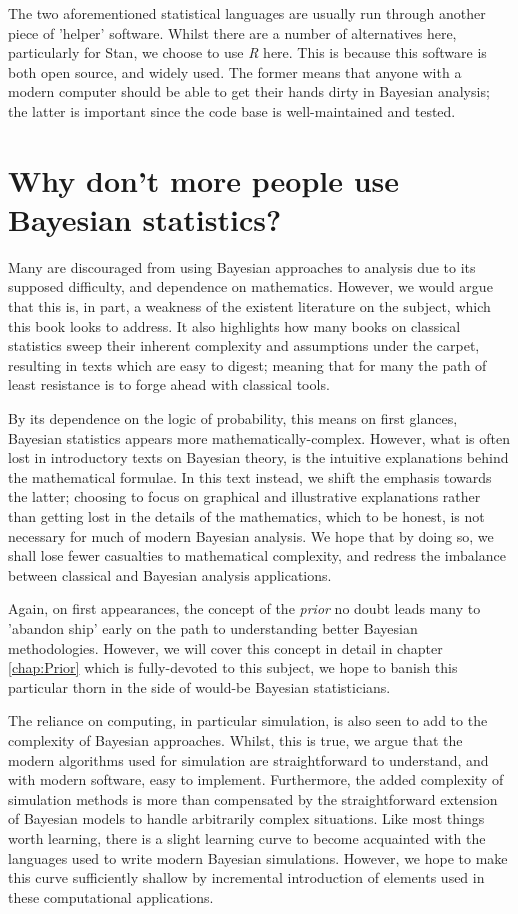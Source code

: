 \documentclass[11pt,fullpage]{book}
\begin{document}
The two aforementioned statistical languages are usually run through another piece of 'helper' software. Whilst there are a number of alternatives here, particularly for Stan, we choose to use \textit{R} here. This is because this software is both open source, and widely used. The former means that anyone with a modern computer should be able to get their hands dirty in Bayesian analysis; the latter is important since the code base is well-maintained and tested.

\section{Why don't more people use Bayesian statistics?}
Many are discouraged from using Bayesian approaches to analysis due to its supposed difficulty, and dependence on mathematics. However, we would argue that this is, in part, a weakness of the existent literature on the subject, which this book looks to address. It also highlights how many books on classical statistics sweep their inherent complexity and assumptions under the carpet, resulting in texts which are easy to digest; meaning that for many the path of least resistance is to forge ahead with classical tools. 

By its dependence on the logic of probability, this means on first glances, Bayesian statistics appears more mathematically-complex. However, what is often lost in introductory texts on Bayesian theory, is the intuitive explanations behind the mathematical formulae. In this text instead, we shift the emphasis towards the latter; choosing to focus on graphical and illustrative explanations rather than getting lost in the details of the mathematics, which to be honest, is not necessary for much of modern Bayesian analysis. We hope that by doing so, we shall lose fewer casualties to mathematical complexity, and redress the imbalance between classical and Bayesian analysis applications.

Again, on first appearances, the concept of the \textit{prior} no doubt leads many to 'abandon ship' early on the path to understanding better Bayesian methodologies. However, we will cover this concept in detail in chapter \ref{chap:Prior} which is fully-devoted to this subject, we hope to banish this particular thorn in the side of would-be Bayesian statisticians.

The reliance on computing, in particular simulation, is also seen to add to the complexity of Bayesian approaches. Whilst, this is true, we argue that the modern algorithms used for simulation are straightforward to understand, and with modern software, easy to implement. Furthermore, the added complexity of simulation methods is more than compensated by the straightforward extension of Bayesian models to handle arbitrarily complex situations. Like most things worth learning, there is a slight learning curve to become acquainted with the languages used to write modern Bayesian simulations. However, we hope to make this curve sufficiently shallow by incremental introduction of elements used in these computational applications.
\end{document}
